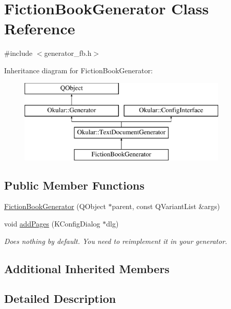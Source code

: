 \hypertarget{classFictionBookGenerator}{\section{Fiction\+Book\+Generator Class Reference}
\label{classFictionBookGenerator}
}


{\ttfamily \#include $<$generator\+\_\+fb.\+h$>$}

Inheritance diagram for Fiction\+Book\+Generator\+:\begin{figure}[H]
\begin{center}
\leavevmode
\includegraphics[height=4.000000cm]{classFictionBookGenerator}
\end{center}
\end{figure}
\subsection*{Public Member Functions}
\begin{DoxyCompactItemize}
\item 
\hyperlink{classFictionBookGenerator_a0b7b22506b1c11e57bfa6e10933d959c}{Fiction\+Book\+Generator} (Q\+Object $\ast$parent, const Q\+Variant\+List \&args)
\item 
void \hyperlink{classFictionBookGenerator_ab88be7d5d552061f08f931cf2d70c248}{add\+Pages} (K\+Config\+Dialog $\ast$dlg)
\begin{DoxyCompactList}\small\item\em Does nothing by default. You need to reimplement it in your generator. \end{DoxyCompactList}\end{DoxyCompactItemize}
\subsection*{Additional Inherited Members}


\subsection{Detailed Description}


